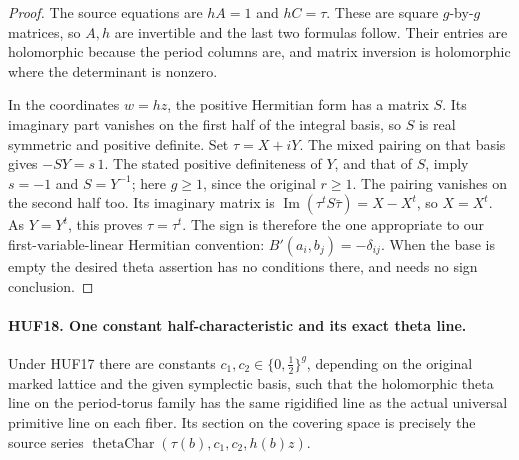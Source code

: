 \documentclass[11pt,a4paper]{article}
\numberwithin{equation}{section}
\theoremstyle{remark}\newtheorem{remark}[theorem]{Remark}
\begin{document}
\begin{proof}
The source equations are \(hA=1\) and
\(hC=\tau\).  These are square \(g\)-by-\(g\)
matrices, so \(A,h\) are invertible and the
last two formulas follow.  Their entries are
holomorphic because the period columns are,
and matrix inversion is holomorphic where the
determinant is nonzero.

In the coordinates \(w=hz\), the positive
Hermitian form has a matrix \(S\).
Its imaginary part vanishes on the first half
of the integral basis, so \(S\) is real symmetric
and positive definite.  Set \(\tau=X+iY\).
The mixed pairing on that basis gives
\(-SY=s\,1\).  The stated positive definiteness
of \(Y\), and that of \(S\), imply \(s=-1\)
and \(S=Y^{-1}\); here \(g\geq1\), since the
original \(r\geq1\).  The pairing vanishes on
the second half too.  Its imaginary matrix is
\(\operatorname{Im}(\tau^tS\bar\tau)=X-X^t\),
so \(X=X^t\).  As \(Y=Y^t\), this proves
\(\tau=\tau^t\).
The sign is therefore the one appropriate to
our first-variable-linear Hermitian convention:
\(B'(a_i,b_j)=-\delta_{ij}\).
When the base is empty the desired theta
assertion has no conditions there, and needs
no sign conclusion.
\end{proof}

\paragraph{HUF18. One constant half-characteristic and its exact theta line.}
\label{claim:HUF18}
Under HUF17 there are constants
\(c_1,c_2\in\{0,\tfrac12\}^g\), depending on
the original marked lattice and the given
symplectic basis, such that the holomorphic
theta line on the period-torus family has
the same rigidified line as the actual
universal primitive line on each fiber.
Its section on the covering space is precisely
the source series
\(\operatorname{thetaChar}(\tau(b),c_1,c_2,h(b)z)\).
\end{document}
